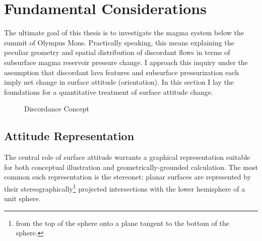 \section{Fundamental Considerations}\label{sec:considerations}

The ultimate goal of this thesis is to investigate the magma system below the summit of Olympus Mons. Practically speaking, this means explaining the peculiar geometry and spatial distribution of discordant flows in terms of subsurface magma reservoir pressure change. I approach this inquiry under the assumption that discordant lava features and subsurface pressurization each imply net change in surface attitude (orientation). In this section I lay the foundations for a quantitative treatment of surface attitude change.

\begin{figure}
    \caption{Discordance Concept}%
    \label{fig:discordance-concept}
\end{figure}


\subsection{Attitude Representation}\label{sec:attitude-representation}

The central role of surface attitude warrants a graphical representation suitable for both conceptual illustration and geometrically-grounded calculation. The most common such representation is the stereonet: planar surfaces are represented by their stereographically\footnote{from the top of the sphere onto a plane tangent to the bottom of the sphere.} projected intersections with the lower hemisphere of a unit sphere.

